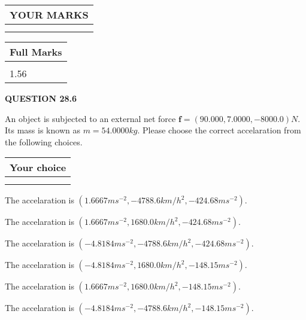 \documentclass[12pt]{article}
\begin{document}
 
 

 

 
\vspace{0.3in}
  
\vspace{0.2in}
  
\noindent\begin{tabular}{|l|}
\hline
 YOUR MARKS  \\
\hline
 \\ 
 \\ 
\hline
\end{tabular}
\hspace{0.05in} \begin{tabular}{|l|}
\hline
 Full Marks  \\
\hline
 \\ 
1.56 \\
\hline
\end{tabular}
{\textbf{\Large{QUESTION
28.6 
}}}
  
  
 
An object is subjected to an external net force $\mathbf{f}=(
90.000 ,
7.0000,
-8000.0  )N$. Its mass is known as
$m= %
54.0000  kg$. Please choose the correct accelaration
from the following choices.
 
  
  
\noindent\hspace{3.0in} \begin{tabular}{|l|}
\hline
Your choice \\
\hline
 \\ 
 \\ 
\hline
\end{tabular}
  
  
 
 
The accelaration is
$(
1.6667ms^{-2},
-4788.6km/h^2,
-424.68ms^{-2}
).
$
 
 
The accelaration is
$(
1.6667ms^{-2},
1680.0km/h^2,
-424.68ms^{-2}
).
$
 
 
The accelaration is
$(
-4.8184ms^{-2},
-4788.6km/h^2,
-424.68ms^{-2}
).
$
 
 
The accelaration is
$(
-4.8184ms^{-2},
1680.0km/h^2,
-148.15ms^{-2}
).
$
 
 
The accelaration is
$(
1.6667ms^{-2},
1680.0km/h^2,
-148.15ms^{-2}
).
$
 
 
The accelaration is
$(
-4.8184ms^{-2},
-4788.6km/h^2,
-148.15ms^{-2}
).
$
 
\end{document}
